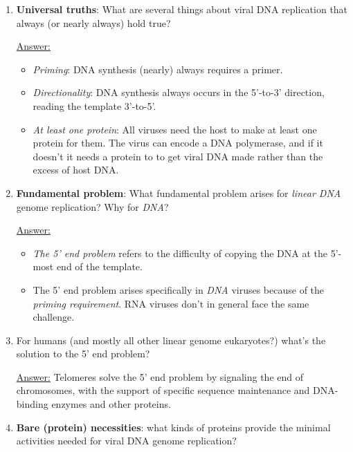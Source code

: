 \documentclass{article}
\newenvironment{QandA}{\begin{enumerate}[label=\bfseries Q\arabic*.]}
                       {\end{enumerate}}
\newenvironment{answered}{\par\normalfont\underline{Answer:}}{}
\begin{document}
\begin{QandA}
\begin{answered}
\begin{itemize}
      \item{Human papillomavirus-16 (HPV-16)}
    \end{itemize}
    \end{answered}
  \item{\textbf{Universal truths}: What are several things about viral DNA replication that always (or nearly always) hold true?}
    \begin{answered}
    \begin{itemize}
      \item{\textit{Priming}: DNA synthesis (nearly) always requires a primer.}
      \item{\textit{Directionality}: DNA synthesis always occurs in the 5'-to-3' direction, reading the template 3'-to-5'.}
      \item{\textit{At least one protein}: All viruses need the host to make at least one protein for them. The virus can encode a DNA polymerase, and if it doesn't it needs a protein to  to get viral DNA made rather than the excess of host DNA.}
    \end{itemize}
    \end{answered}
  \item{\textbf{Fundamental problem}: What fundamental problem arises for \textit{linear DNA} genome replication? Why for \textit{DNA}?}
    \begin{answered}
    \begin{itemize}
      \item{\textit{The 5' end problem} refers to the difficulty of copying the DNA at the 5'-most end of the template.}
      \item{The 5' end problem arises specifically in \textit{DNA} viruses because of the \textit{priming requirement}. RNA viruses don't in general face the same challenge.}
    \end{itemize}
    \end{answered}
  \item{For humans (and mostly all other linear genome eukaryotes?) what's the solution to the 5' end problem?}
    \begin{answered}
    Telomeres solve the 5' end problem by signaling the end of chromosomes, with the support of specific sequence maintenance and DNA-binding enzymes and other proteins.
    \end{answered}
  \item{\textbf{Bare (protein) necessities}: what kinds of proteins provide the minimal activities needed for viral DNA genome replication?}

\end{QandA}
\end{document}
